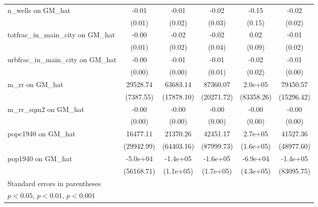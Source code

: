 {\begin{tabular}{l*{5}{c}}
\addlinespace
n\_wells on GM\_hat&    -0.01         &    -0.01         &    -0.02         &    -0.15         &    -0.02         \\
                &   (0.01)         &   (0.02)         &   (0.03)         &   (0.15)         &   (0.02)         \\
\addlinespace
totfrac\_in\_main\_city on GM\_hat&    -0.00         &    -0.02         &    -0.02         &     0.02         &    -0.01         \\
                &   (0.01)         &   (0.02)         &   (0.04)         &   (0.09)         &   (0.02)         \\
\addlinespace
urbfrac\_in\_main\_city on GM\_hat&    -0.00\sym{**} &    -0.01\sym{***}&    -0.01\sym{**} &    -0.02         &    -0.01\sym{***}\\
                &   (0.00)         &   (0.00)         &   (0.01)         &   (0.02)         &   (0.00)         \\
\addlinespace
m\_rr on GM\_hat  & 29528.74\sym{***}& 63683.14\sym{***}& 87360.07\sym{***}&  2.0e+05\sym{*}  & 79450.57\sym{***}\\
                &(7387.55)         &(17878.10)         &(20271.72)         &(83358.26)         &(15296.42)         \\
\addlinespace
m\_rr\_sqm2 on GM\_hat&    -0.00\sym{***}&    -0.00\sym{***}&    -0.00\sym{***}&    -0.00         &    -0.00\sym{***}\\
                &   (0.00)         &   (0.00)         &   (0.00)         &   (0.00)         &   (0.00)         \\
\addlinespace
popc1940 on GM\_hat& 16477.11         & 21370.26         & 42451.17         &  2.7e+05         & 41527.36         \\
                &(29942.99)         &(64403.16)         &(87999.73)         &(1.6e+05)         &(48977.60)         \\
\addlinespace
pop1940 on GM\_hat& -5.0e+04         & -1.4e+05         & -1.6e+05         & -6.9e+04         & -1.4e+05         \\
                &(56168.71)         &(1.1e+05)         &(1.7e+05)         &(4.3e+05)         &(83095.75)         \\
\bottomrule
\multicolumn{6}{l}{\footnotesize Standard errors in parentheses}\\
\multicolumn{6}{l}{\footnotesize \sym{*} \(p<0.05\), \sym{**} \(p<0.01\), \sym{***} \(p<0.001\)}\\
\end{tabular}
}
